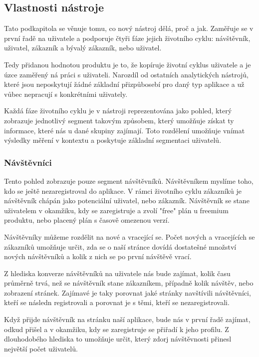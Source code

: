 \documentclass[bc,male,java,dept456]{diploma}						%
\begin{document}
\subsection{Vlastnosti nástroje}


Tato podkapitola se věnuje tomu, co nový nástroj dělá, proč a jak. Zaměřuje se v první řadě na uživatele a podporuje čtyři fáze jejich životního cyklu: návštěvník, uživatel, zá\-kaz\-ník a bývalý zákazník, nebo uživatel.

Tedy přidanou hodnotou produktu je to, že kopíruje životní cyklus uživatele a je úzce zaměřený ná práci s uživateli. Narozdíl od ostatních analytických nástrojů, které jsou neposkytují žádné základní přizpůbosebí pro daný typ aplikace a už vůbec nepracují s konkrétními uživately.

Každá fáze životního cyklu je v nástroji reprezentována jako pohled, který zobrazuje jednotlivý segment takovým způsobem, který umožňuje získat ty informace, které nás u dané skupiny zajímají. Toto rozdělení umožňuje vnímat výsledky měření v kontextu a poskytuje základní segmentaci uživatelů.



\subsubsection{Návštěvníci}

Tento pohled zobrazuje pouze segment návštěvníků. Návštěvníkem myslíme toho, kdo se ještě nezaregistroval do aplikace. V rámci životního cyklu zákazníků je návštěvník chápán jako potenciální uživatel, nebo zákazník. Návštěvník se stane uživatelem v o\-ka\-mži\-ku, kdy se zaregistruje a zvolí "free" plán u freemium produktu, nebo placený plán s časově omezenou verzí.

Návštěvníky můžeme rozdělit na nové a vracející se. Počet nových a vracejících se zákazníků umožňuje určit, zda se o naší stránce dovídá dostatešné množství nových návštěvníků a kolik z nich se po první návštěvě vrací. 

Z hlediska konverze návštěvníků na uživatele nás bude zajímat, kolik času průměrně trvá, než se návštěvník stane zákazníkem, případně kolik návštěv, nebo zobrazení stránek. Zajímavé je taky porovnat jaké stránky navštívili návštěvníci, kteří se následn registrovali a porovnat je s těmi, kteří se nezaregistrovali.

Když přijde návštěvník na stránku naší aplikace, bude nás v první řadě zajímat, odkud přišel a v okamžiku, kdy se zaregistruje se přiřadí k jeho profilu. Z dlouhodobého hlediska to umožňuje určit, který zdorj návštěvnosti přinesl největší počet uživatelů. 
\end{document}
